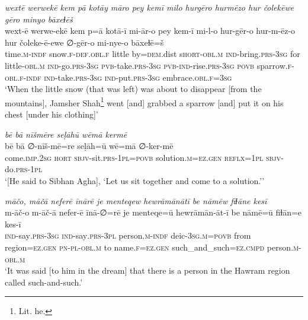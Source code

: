 \ea \label{DP.36}
\textit{wextē werwekē kem pā kotāy māro pey kemī milo hurgēro hurmēzo hur čolekēwe gēro minyo bāxeɫēš} \\ 
\gll wext-ē werwe-ekē kem p=ā kotā-ī mi-ār-o pey kem-ī mi-l-o hur-gēr-o hur-m-ēz-o hur čoleke-ē-ewe ∅-gēr-o mi-nye-o bāxeɫē=š \\ 
 time\textsc{.m}\textsc{-indf} snow\textsc{\textsc{.f}}\textsc{-def}\textsc{.obl}\textsc{\textsc{.f}} little by\textsc{=dem}.dist s\textsc{hort}\textsc{-obl}\textsc{.m} \textsc{ind-}bring\textsc{.prs}\textsc{-3sg} for little\textsc{-obl}\textsc{.m} \textsc{ind-}go\textsc{.prs}\textsc{-3sg} \textsc{pvb-}take\textsc{.prs}\textsc{-3sg} \textsc{pvb-}\textsc{ind-}rise\textsc{.prs}\textsc{-3sg} \textsc{povb} sparrow\textsc{\textsc{.f}}\textsc{-obl}\textsc{\textsc{.f}}\textsc{-indf} \textsc{ind-}take\textsc{.prs}\textsc{-3sg} \textsc{ind-}put\textsc{.prs}\textsc{-3sg} embrace\textsc{.obl}\textsc{\textsc{.f}}\textsc{=3sg} \\ 
\glt `When the little snow (that was left) was about to disappear [from the mountains], Jamsher Shah\footnote{Lit. he.} went [and] grabbed a sparrow [and] put it on his chest [under his clothing]'
\z 
 
\ea \label{DP.39}
\textit{bē bā nīšmēre seḷāhū wēmā kermē} \\ 
\gll bē bā ∅-nīš-mē=re seḷāh=ū wē=mā ∅-ker-mē \\ 
 come\textsc{.imp}\textsc{.\textsc{2sg}} \textsc{hort} \textsc{sbjv-}sit\textsc{.prs}\textsc{-1pl}\textsc{=\textsc{povb}} solution\textsc{.m}\textsc{=ez}\textsc{.gen} \textsc{reflx}\textsc{=1pl} \textsc{sbjv-}do\textsc{.prs}\textsc{-1pl} \\ 
\glt `[He said to Sibhan Agha], ‘Let us sit together and come to a solution.’'
\z 
 
\ea \label{ZP.31}
\textit{māčo, māčā neferē īnārē je menteqew hewrāmānātī be nāmēw fiɫāne kesī} \\ 
\gll m-āč-o m-āč-ā nefer-ē īnā-∅=rē je menteqe=ū hewrāmān-āt-ī be nāmē=ū fiɫān=e kes-ī \\ 
 \textsc{ind-}say\textsc{.prs}\textsc{-3sg} \textsc{ind-}say\textsc{.prs}\textsc{-3pl} person\textsc{.m}\textsc{-indf} deic\textsc{-3sg}\textsc{.m}\textsc{=\textsc{povb}} from region\textsc{\textsc{=ez.gen}} \textsc{pn}\textsc{\textsc{-pl}}\textsc{-obl}\textsc{.m} to name\textsc{.f}\textsc{\textsc{=ez.gen}} such\_and\_such\textsc{=ez}\textsc{.cmpd} person\textsc{.m}\textsc{-obl}\textsc{.m} \\ 
\glt `It was said [to him in the dream] that there is a person in the Hawram region called such-and-such.'
\z 
 
